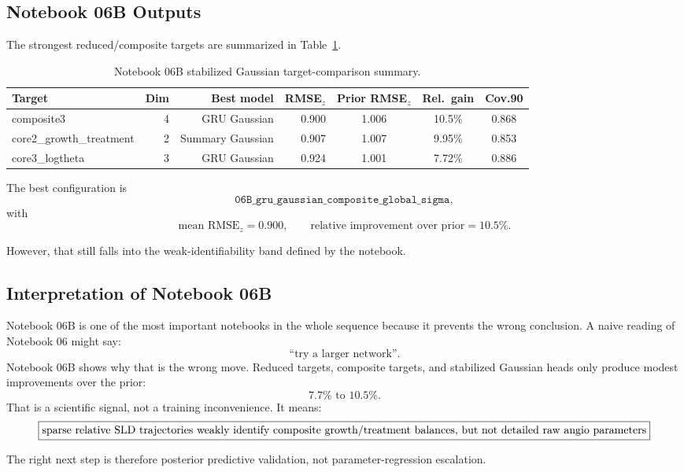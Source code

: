 \documentclass[11pt,a4paper]{article}
\newcommand{\sld}{\ensuremath{\mathrm{SLD}}}
\begin{document}
\subsection{Notebook 06B Outputs}

The strongest reduced/composite targets are summarized in Table~\ref{tab:n06b}.

\begin{table}[H]
\centering
\small
\caption{Notebook 06B stabilized Gaussian target-comparison summary.}
\label{tab:n06b}
\begin{tabular}{p{}rrrccc}
\toprule
Target & Dim & Best model & RMSE$_z$ & Prior RMSE$_z$ & Rel.\ gain & Cov.90 \\
\midrule
composite3 & 4 & GRU Gaussian & 0.900 & 1.006 & 10.5\% & 0.868 \\
core2\_growth\_treatment & 2 & Summary Gaussian & 0.907 & 1.007 & 9.95\% & 0.853 \\
core3\_logtheta & 3 & GRU Gaussian & 0.924 & 1.001 & 7.72\% & 0.886 \\
\bottomrule
\end{tabular}
\end{table}

The best configuration is
\[
    \texttt{06B\_gru\_gaussian\_composite\_global\_sigma},
\]
with
\[
    \text{mean RMSE}_z=0.900,
    \qquad
    \text{relative improvement over prior}=10.5\%.
\]

However, that still falls into the weak-identifiability band defined by the notebook.

\subsection{Interpretation of Notebook 06B}

Notebook 06B is one of the most important notebooks in the whole sequence because it prevents the wrong conclusion. A naive reading of Notebook 06 might say:
\[
    \text{``try a larger network''}.
\]
Notebook 06B shows why that is the wrong move. Reduced targets, composite targets, and stabilized Gaussian heads only produce modest improvements over the prior:
\[
    7.7\%\text{ to }10.5\%.
\]
That is a scientific signal, not a training inconvenience. It means:
\[
\boxed{
\text{sparse relative \sld{} trajectories weakly identify composite growth/treatment balances, but not detailed raw angio parameters}
}
\]

The right next step is therefore posterior predictive validation, not parameter-regression escalation.
\end{document}
